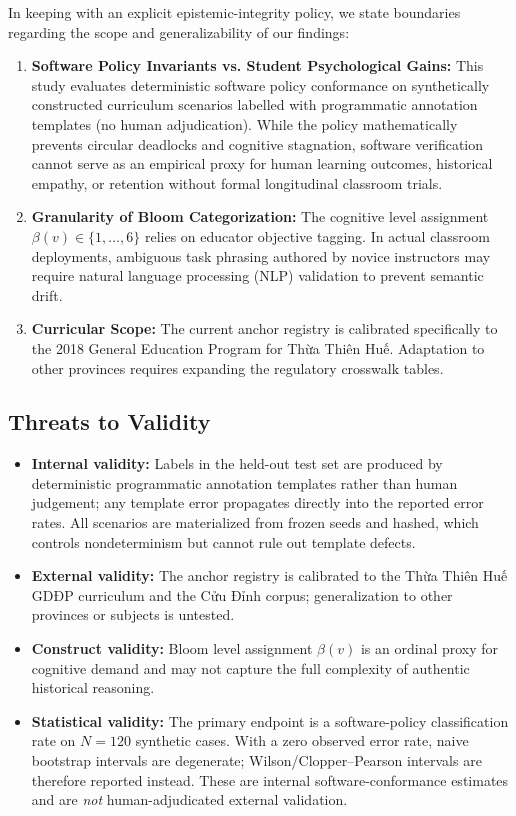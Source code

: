\documentclass[11pt,a4paper]{article}
\begin{document}
In keeping with an explicit epistemic-integrity policy, we state boundaries regarding the scope and generalizability of our findings:
\begin{enumerate}
    \item \textbf{Software Policy Invariants vs. Student Psychological Gains:} This study evaluates deterministic software policy conformance on synthetically constructed curriculum scenarios labelled with programmatic annotation templates (no human adjudication). While the policy mathematically prevents circular deadlocks and cognitive stagnation, software verification cannot serve as an empirical proxy for human learning outcomes, historical empathy, or retention without formal longitudinal classroom trials.
    \item \textbf{Granularity of Bloom Categorization:} The cognitive level assignment $\beta(v) \in \{1, \dots, 6\}$ relies on educator objective tagging. In actual classroom deployments, ambiguous task phrasing authored by novice instructors may require natural language processing (NLP) validation to prevent semantic drift.
    \item \textbf{Curricular Scope:} The current anchor registry is calibrated specifically to the 2018 General Education Program for Thừa Thiên Huế. Adaptation to other provinces requires expanding the regulatory crosswalk tables.
\end{enumerate}

\subsection{Threats to Validity}

\begin{itemize}
    \item \textbf{Internal validity:} Labels in the held-out test set are produced by deterministic programmatic annotation templates rather than human judgement; any template error propagates directly into the reported error rates. All scenarios are materialized from frozen seeds and hashed, which controls nondeterminism but cannot rule out template defects.
    \item \textbf{External validity:} The anchor registry is calibrated to the Thừa Thiên Huế GDĐP curriculum and the Cửu Đỉnh corpus; generalization to other provinces or subjects is untested.
    \item \textbf{Construct validity:} Bloom level assignment $\beta(v)$ is an ordinal proxy for cognitive demand and may not capture the full complexity of authentic historical reasoning.
    \item \textbf{Statistical validity:} The primary endpoint is a software-policy classification rate on $N=120$ synthetic cases. With a zero observed error rate, naive bootstrap intervals are degenerate; Wilson/Clopper--Pearson intervals are therefore reported instead. These are internal software-conformance estimates and are \emph{not} human-adjudicated external validation.
\end{itemize}
\end{document}
